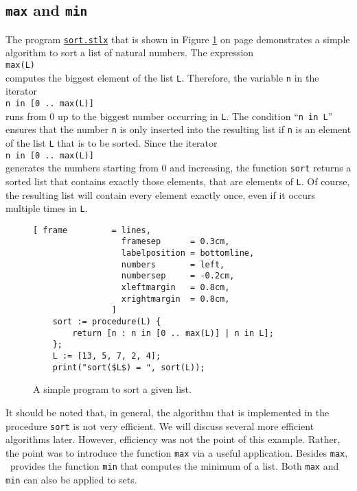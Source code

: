 \subsection{\texttt{max} and \texttt{min}}
The program
\href{https://github.com/karlstroetmann/Logik/blob/master/SetlX/sort.stlx}{\texttt{sort.stlx}}
that is shown in Figure \ref{fig:sort.stlx} on page \pageref{fig:sort.stlx} demonstrates a simple algorithm 
to sort a list of natural numbers.  The expression \\[0.2cm]
\hspace*{1.3cm}
\texttt{max(L)}
\\[0.2cm]
computes the biggest element of the list \texttt{L}.  Therefore, the variable \texttt{n} in the iterator
\\[0.2cm]
\hspace*{1.3cm}
\texttt{n in [0 .. max(L)]}
\\[0.2cm]
runs from 0 up to the biggest number occurring in \texttt{L}.  The condition ``\texttt{n in L}''
ensures that the number \texttt{n} is only inserted into the resulting list if \texttt{n} is an
element of the list \texttt{L} that is to be sorted.  Since the iterator
\\[0.2cm]
\hspace*{1.3cm}
\texttt{n in [0 .. max(L)]}
\\[0.2cm]
generates the numbers starting from 0 and increasing, the function \texttt{sort} returns a sorted
list that contains exactly those elements, that are elements of \texttt{L}.  Of course, the
resulting list will contain every element exactly once, even if it occurs multiple times in \texttt{L}.

\begin{figure}[!ht]
  \centering
\begin{Verbatim}[ frame         = lines, 
                  framesep      = 0.3cm, 
                  labelposition = bottomline,
                  numbers       = left,
                  numbersep     = -0.2cm,
                  xleftmargin   = 0.8cm,
                  xrightmargin  = 0.8cm,
                ]
    sort := procedure(L) {
        return [n : n in [0 .. max(L)] | n in L];
    };
    L := [13, 5, 7, 2, 4];
    print("sort($L$) = ", sort(L));
\end{Verbatim} 
\vspace*{-0.3cm}
\caption{A simple program to sort a given list.}  \label{fig:sort.stlx}
\end{figure} %

It should be noted that, in general, the algorithm that is implemented in the procedure \texttt{sort} is not very
efficient.  We will discuss several more efficient algorithms later.  However, efficiency was not
the point of this example.  Rather, the point was to introduce the function \texttt{max} via a
useful application.  Besides \texttt{max}, \setlx\ provides the function \texttt{min} that computes
the minimum of a list.  Both \texttt{max} and \texttt{min} can also be applied to sets.

